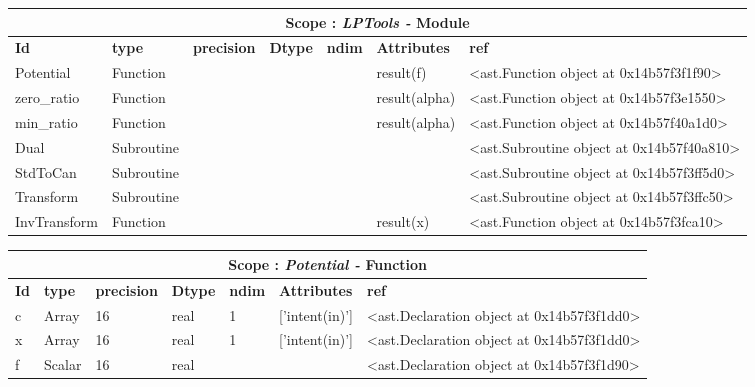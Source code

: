 \documentclass{report}
\begin{document}
\begin{center}
\begin{longtable}{|p{3.5cm}|p{1.5cm}|p{1.5cm}|p{1.5cm}|p{1cm}|p{2cm}|p{4cm}| }
\hline
\multicolumn{7}{|c|}{\textbf{Scope : \qquad}  \textbf{\textit{LPTools - }Module}}\\ 
\hline
\textbf{Id} & \textbf{type} & \textbf{precision} & \textbf{Dtype} & \textbf{ndim} & \textbf{Attributes} & \textbf{ref} \\\hline

Potential & Function &  &  &  & result(f) & <ast.Function object at 0x14b57f3f1f90> \\\hline

zero\_ratio & Function &  &  &  & result(alpha) & <ast.Function object at 0x14b57f3e1550> \\\hline

min\_ratio & Function &  &  &  & result(alpha) & <ast.Function object at 0x14b57f40a1d0> \\\hline

Dual & Subroutine &  &  &  &  & <ast.Subroutine object at 0x14b57f40a810> \\\hline

StdToCan & Subroutine &  &  &  &  & <ast.Subroutine object at 0x14b57f3ff5d0> \\\hline

Transform & Subroutine &  &  &  &  & <ast.Subroutine object at 0x14b57f3ffc50> \\\hline

InvTransform & Function &  &  &  & result(x) & <ast.Function object at 0x14b57f3fca10> \\\hline

\end{longtable}
\end{center}

 \vspace{1cm}

\begin{center}
\begin{longtable}{|p{3.5cm}|p{1.5cm}|p{1.5cm}|p{1.5cm}|p{1cm}|p{2cm}|p{4cm}| }
\hline
\multicolumn{7}{|c|}{\textbf{Scope : \qquad}  \textbf{\textit{Potential - }Function}}\\ 
\hline
\textbf{Id} & \textbf{type} & \textbf{precision} & \textbf{Dtype} & \textbf{ndim} & \textbf{Attributes} & \textbf{ref} \\\hline

c & Array & 16 & real & 1 & ['intent(in)'] & <ast.Declaration object at 0x14b57f3f1dd0> \\\hline

x & Array & 16 & real & 1 & ['intent(in)'] & <ast.Declaration object at 0x14b57f3f1dd0> \\\hline

f & Scalar & 16 & real &  &  & <ast.Declaration object at 0x14b57f3f1d90> \\\hline

\end{longtable}
\end{center}
\end{document}
